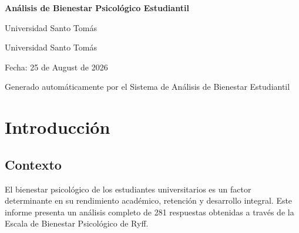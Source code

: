 \documentclass[12pt,a4paper]{article}
\begin{document}
\begin{titlepage}
\centering
\vspace*{2cm}

{\Huge\bfseries\textcolor{ustblue}{Análisis de Bienestar Psicológico Estudiantil}\par}

\vspace{1cm}

{\Large\textcolor{ustgray}{Universidad Santo Tomás}\par}

\vspace{0.5cm}

{\large\textcolor{ustgray}{Universidad Santo Tomás}\par}

\vspace{2cm}

{\large\textcolor{ustgray}{Fecha: 25 de August de 2026}\par}

\vspace{1cm}


\vfill

{\small\textcolor{ustgray}{Generado automáticamente por el Sistema de Análisis de Bienestar Estudiantil}\par}
\end{titlepage}

\tableofcontents
\newpage

\section{Introducción}

\subsection{Contexto}
El bienestar psicológico de los estudiantes universitarios es un factor determinante 
en su rendimiento académico, retención y desarrollo integral. Este informe presenta 
un análisis completo de 281 respuestas obtenidas a través 
de la Escala de Bienestar Psicológico de Ryff.
\end{document}
